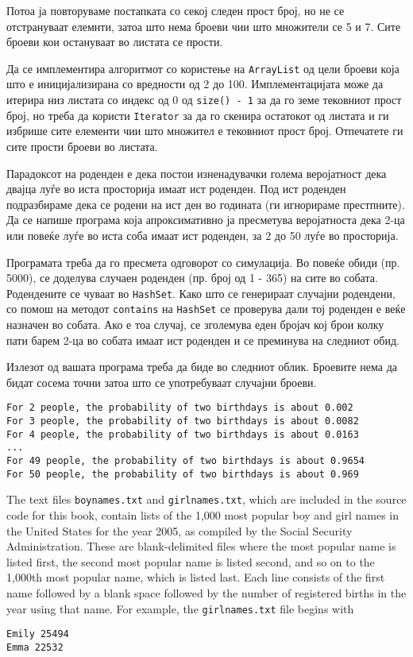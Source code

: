\begin{questions}
Потоа ја повторуваме постапката со секој следен прост број, но не се
отстрануваат елемнти, затоа што нема броеви чии што множители се 5 и 7. Сите
броеви кои остануваат во листата се прости.

Да се имплементира алгоритмот со користење на \texttt{ArrayList} од цели броеви
која што е иницијализирана со вредности од 2 до 100. Имплементацијата може да
итерира низ листата со индекс од 0 од \texttt{size() - 1} за да го земе
тековниот прост број, но треба да користи \texttt{Iterator} за да го скенира
остатокот од листата и ги избрише сите елементи чии што множител е тековниот
прост број. Отпечатете ги сите прости броеви во листата.



\question
Парадоксот на роденден е дека постои изненадувачки голема веројатност дека
двајца луѓе во иста просторија имаат ист роденден. Под ист роденден подразбираме
дека се родени на ист ден во годината (ги игнорираме престпните). Да се напише
програма која апроксимативно ја пресметува веројатноста дека 2-ца или повеќе
луѓе во иста соба имаат ист роденден, за 2 до 50 луѓе во просторија.

Програмата треба да го пресмета одговорот со симулација. Во повеќе обиди (пр.
5000), се доделува случаен роденден (пр. број од 1 - 365) на сите во собата.
Родендените се чуваат во \texttt{HashSet}. Како што се генерираат случајни
родендени, со помош на методот \texttt{contains} на \texttt{HashSet} се
проверува дали тој роденден е веќе назначен во собата. Ако е тоа случај, се
зголемува еден бројач кој брои колку пати барем 2-ца во собата имаат ист
роденден и се преминува на следниот обид. 

Излезот од вашата програма треба да биде во следниот облик. Броевите нема да
бидат сосема точни затоа што се употребуваат случајни броеви.
\begin{verbatim}
For 2 people, the probability of two birthdays is about 0.002
For 3 people, the probability of two birthdays is about 0.0082
For 4 people, the probability of two birthdays is about 0.0163
...
For 49 people, the probability of two birthdays is about 0.9654
For 50 people, the probability of two birthdays is about 0.969
\end{verbatim}



\question

The text files \texttt{boynames.txt} and \texttt{girlnames.txt}, which are included in the source
code for this book, contain lists of the 1,000 most popular boy and girl names in the
United States for the year 2005, as compiled by the Social Security Administration.
These are blank-delimited files where the most popular name is listed first, the
second most popular name is listed second, and so on to the 1,000th most popular
name, which is listed last. Each line consists of the first name followed by a blank
space followed by the number of registered births in the year using that name. For
example, the \texttt{girlnames.txt} file begins with
\begin{verbatim}
Emily 25494
Emma 22532
\end{verbatim}


\end{questions}
